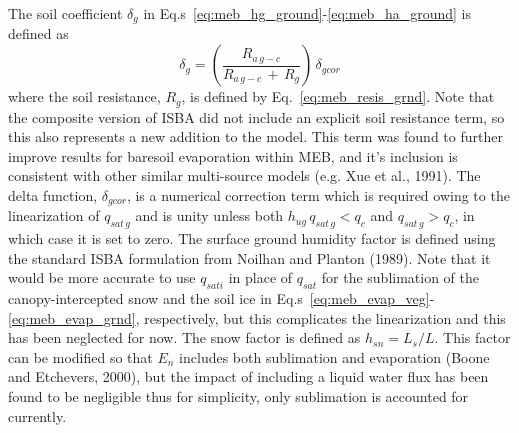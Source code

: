 The soil coefficient $\delta_{g}$ in Eq.s~\ref{eq:meb_hg_ground}-\ref{eq:meb_ha_ground}
is defined as
%
\begin{equation}
\label{eq:meb_resis_grnd_delta_g}
%
\delta_{g} = \left({\frac{R_{a\,g-c}}
{R_{a\,g-c} \,+\, R_g}}\right) \, \delta_{gcor}
%
\end{equation}
%
where the soil resistance, $R_g$, is defined by Eq.~\ref{eq:meb_resis_grnd}.
Note that the composite version of ISBA did not include an explicit
soil resistance term, so this also represents a new addition to the model.
This term was found to further improve results for baresoil evaporation
within MEB, and it's inclusion is consistent with other similar
multi-source models 
(e.g. Xue et al., 1991)\nocite{Xue91}.
%
The delta function, $\delta_{gcor}$, 
is a numerical correction term 
which is
required owing to the linearization of $q_{sat\,g}$
and is unity unless both $ h_{ug}\, q_{sat\,g}< q_c$ and
$q_{sat\,g} > q_c$, in which case it is set to zero. 
%
The surface ground humidity factor is defined using the standard ISBA
formulation from Noilhan and Planton (1989)\nocite{Noilhan1989}.
%
%
%
Note that it would be more accurate to use $q_{sati}$ in place of
$q_{sat}$ for the sublimation of the canopy-intercepted snow and the soil ice 
in Eq.s~\ref{eq:meb_evap_veg}-\ref{eq:meb_evap_grnd}, respectively,
but this complicates the linearization and this has been neglected for now.
%
The snow factor is defined as $h_{sn} = L_s/{L}$. This
factor can be modified so that $E_n$ includes both sublimation and
evaporation (Boone and Etchevers, 2000)\nocite{Boone2001},
but the impact of including a liquid water flux has been found 
to be negligible thus for simplicity, 
only sublimation is accounted for currently. 
%

